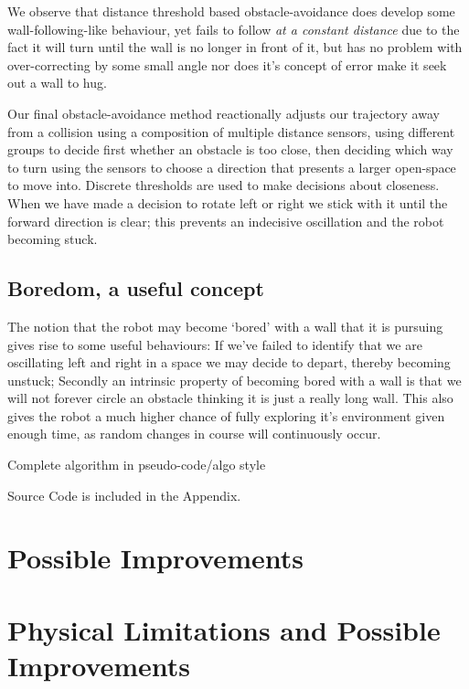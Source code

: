 \documentclass[11pt, a4paper]{article}
\begin{document}
We observe that distance threshold based obstacle-avoidance does develop some 
wall-following-like behaviour, yet fails to follow \emph{at a constant distance} due 
to the fact it will turn until the wall is no longer in front of it, but has no problem 
with over-correcting by some small angle nor does it's concept of error make it seek 
out a wall to hug.

Our final obstacle-avoidance method reactionally adjusts our trajectory away from a 
collision using a composition of multiple distance sensors, using different groups to 
decide first whether an obstacle is too close, then deciding which way to turn using 
the sensors to choose a direction that presents a larger open-space to move into.
Discrete thresholds are used to make decisions about closeness. When we have made a 
decision to rotate left or right we stick with it until the forward direction is clear; 
this prevents an indecisive oscillation and the robot becoming stuck.

\subsection{Boredom, a useful concept}

The notion that the robot may become `bored' with a wall that it is pursuing gives 
rise to some useful behaviours: If we've failed to identify that we are oscillating 
left and right in a space we may decide to depart, thereby becoming unstuck; Secondly 
an intrinsic property of becoming bored with a wall is that we will not forever circle 
an obstacle thinking it is just a really long wall. This also gives the robot a much 
higher chance of fully exploring it's environment given enough time, as random changes 
in course will continuously occur.

Complete algorithm in pseudo-code/algo style

Source Code is included in the Appendix.



\section{Possible Improvements}

\section{Physical Limitations and Possible Improvements}
\end{document}
